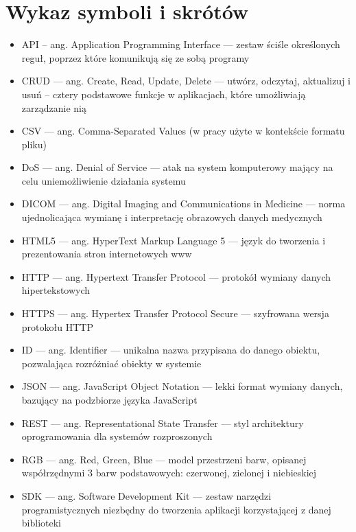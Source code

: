 \documentclass[a4paper,11pt,twoside,openright]{report}
\newcommand\blankpage{%
    \null
    \thispagestyle{empty}%
    \newpage}
\theoremstyle{definition}
\begin{document}



\afterpage{\blankpage}
\chapter*{Wykaz symboli i skrótów}


\begin{itemize}[noitemsep]
\item API -- ang. Application Programming Interface --- zestaw ściśle określonych reguł, poprzez które komunikują się ze sobą programy\\
\item CRUD --- ang. Create, Read, Update, Delete --- utwórz, odczytaj, aktualizuj i usuń -- cztery podstawowe funkcje w aplikacjach, które umożliwiają zarządzanie nią\\
\item CSV --- ang. Comma-Separated Values (w pracy użyte w kontekście formatu pliku) \\
\item DoS --- ang. Denial of Service --- atak na system komputerowy mający na celu uniemożliwienie działania systemu\\
\item DICOM --- ang. Digital Imaging and Communications in Medicine --- norma ujednolicająca wymianę i interpretację obrazowych danych medycznych\\
\item HTML5 --- ang. HyperText Markup Language 5 --- język do tworzenia i prezentowania stron internetowych www\\
\item HTTP --- ang. Hypertext Transfer Protocol --- protokół wymiany danych hipertekstowych\\
\item HTTPS --- ang. Hypertex Transfer Protocol Secure --- szyfrowana wersja protokołu HTTP\\
\item ID --- ang. Identifier --- unikalna nazwa przypisana do danego obiektu, pozwalająca rozróżniać obiekty w systemie\\
\item JSON --- ang. JavaScript Object Notation --- lekki format wymiany danych, bazujący na podzbiorze języka JavaScript\\
\item REST --- ang. Representational State Transfer --- styl architektury oprogramowania dla systemów rozproszonych\\
\item RGB --- ang. Red, Green, Blue --- model przestrzeni barw, opisanej współrzędnymi 3 barw podstawowych: czerwonej, zielonej i niebieskiej\\
\item SDK --- ang. Software Development Kit --- zestaw narzędzi programistycznych niezbędny do tworzenia aplikacji korzystającej z danej biblioteki\\
\end{itemize}
\end{document}
